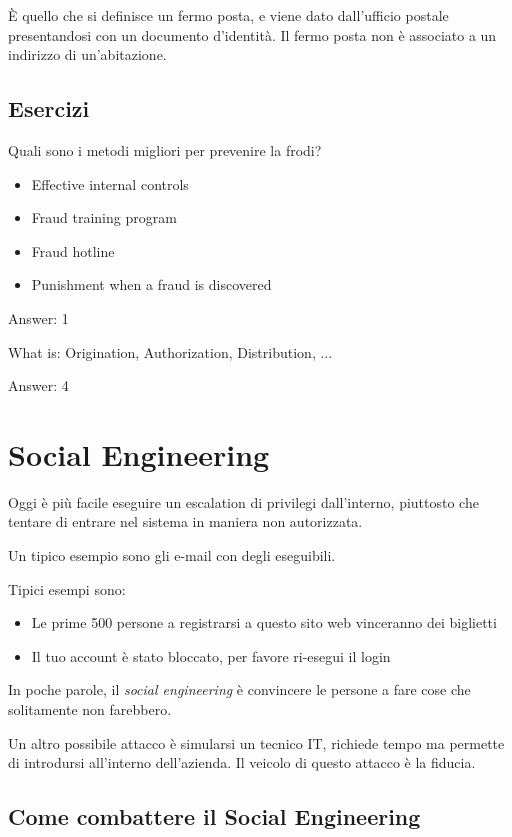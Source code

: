 È quello che si definisce un fermo posta, e viene dato dall'ufficio postale 
presentandosi con un documento d'identità. Il fermo posta non è associato a un 
indirizzo di un'abitazione.

\subsection{Esercizi}

Quali sono i metodi migliori per prevenire la frodi?
\begin{itemize}
  \item Effective internal controls
  \item Fraud training program
  \item Fraud hotline
  \item Punishment when a fraud is discovered
\end{itemize}

Answer: 1


What is: Origination, Authorization, Distribution, ...

Answer: 4


\section{Social Engineering}

Oggi è più facile eseguire un escalation di privilegi dall'interno, piuttosto 
che tentare di entrare nel sistema in maniera non autorizzata.

Un tipico esempio sono gli e-mail con degli eseguibili.

Tipici esempi sono:
\begin{itemize}
  \item Le prime 500 persone a registrarsi a questo sito web vinceranno dei 
  biglietti
  \item Il tuo account è stato bloccato, per favore ri-esegui il login
\end{itemize}

In poche parole, il \textit{social engineering} è convincere le persone a fare 
cose che solitamente non farebbero.

Un altro possibile attacco è simularsi un tecnico IT, richiede tempo ma 
permette di introdursi all'interno dell'azienda. Il veicolo di questo attacco è 
la fiducia.

\subsection{Come combattere il Social Engineering}

